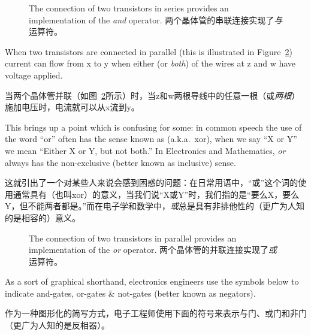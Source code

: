 \begin{figure}[!hbtp] 
\begin{center}

\end{center}
\caption[Series connections implement \emph{and}.]{%
The connection of two transistors in series provides %
an implementation of the {\em and} operator. 两个晶体管的串联连接实现了{\em 与}运算符。}
\label{fig:series}
\end{figure}

When two transistors are connected in parallel (this is illustrated in
Figure~\ref{fig:par}) current can flow from x to y when either (or {\em both})
of the wires at z and w have voltage applied.

当两个晶体管并联（如图~\ref{fig:par}所示）时，当z和w两根导线中的任意一根（或{\em 两根}）施加电压时，电流就可以从x流到y。

This brings up a point
which is confusing for some: in common speech the use of the word ``or'' often
has the sense known as  (a.k.a.\ xor), when we say ``X or Y''
we mean ``Either X or Y, but not both.''  In Electronics and Mathematics,
{\em or} always has the non-exclusive (better known as 
inclusive) sense.

这就引出了一个对某些人来说会感到困惑的问题：在日常用语中，“或”这个词的使用通常具有（也叫xor）的意义，当我们说“X或Y”时，我们指的是“要么X，要么Y，但不能两者都是。”而在电子学和数学中，{\em 或}总是具有非排他性的（更广为人知的是相容的）意义。

\begin{figure}[!hbtp] 
\begin{center}

\end{center}
\caption[Parallel connections implement \emph{or}.]{%
The connection of two transistors in parallel provides %
an implementation of the {\em or} operator. 两个晶体管的并联连接实现了{\em 或}运算符。}
\label{fig:par}
\end{figure}

\newpage

As a sort of graphical shorthand, electronics engineers use the symbols
below to indicate and-gates, or-gates \& not-gates (better known as negators).

作为一种图形化的简写方式，电子工程师使用下面的符号来表示与门、或门和非门（更广为人知的是反相器）。

